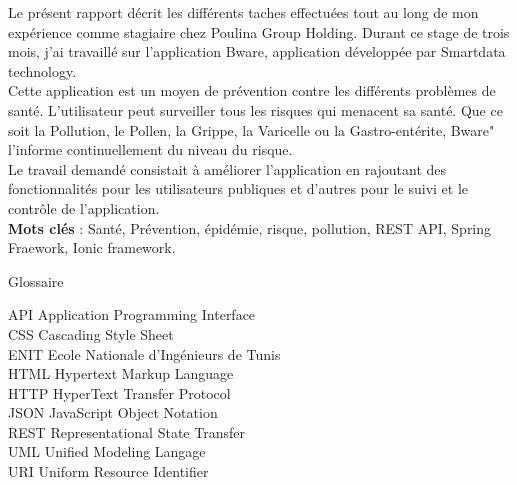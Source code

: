 \documentclass[11pt,fleqn]{book} %
\begin{document}
	Le présent rapport décrit les différents taches effectuées tout au long de mon expérience comme stagiaire chez Poulina Group Holding. Durant ce stage de trois mois, j'ai travaillé sur l'application Bware, application développée par Smartdata technology.\\
	Cette application est un moyen de prévention contre les différents problèmes de santé. L'utilisateur peut surveiller tous les risques qui menacent sa santé. Que ce soit la Pollution, le Pollen, la Grippe, la Varicelle ou la Gastro-entérite, Bware" l'informe continuellement du niveau du risque.\\
	
	Le travail demandé consistait à améliorer l'application en rajoutant des fonctionnalités pour les utilisateurs publiques et d'autres pour le suivi et le contrôle de l'application.\\
	
	\textbf{Mots clés} : Santé, Prévention, épidémie, risque, pollution, REST API, Spring Fraework, Ionic framework.\\
	
	

	\newpage
	\vspace*{4cm}	
	{\LARGE Glossaire}
	
	\vspace*{1cm}
	\begin{flushleft}
		API Application Programming Interface\\
		CSS Cascading Style Sheet\\
		ENIT Ecole Nationale d’Ingénieurs de Tunis\\
		HTML Hypertext Markup Language\\
		HTTP HyperText Transfer Protocol\\
		JSON JavaScript Object Notation\\
		REST Representational State Transfer\\
		UML Unified Modeling Langage\\
		URI Uniform Resource Identifier\\
	\end{flushleft}

	\newpage
	\let\cleardoublepage\clearpage
	\renewcommand\listfigurename{Liste des figures}
	\listoffigures
	
\end{document}
